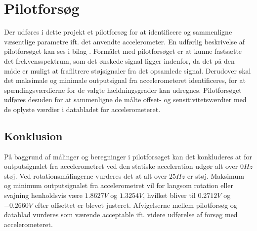 \section{Pilotforsøg}\label{Sec:PilotforsoegKort}
Der udføres i dette projekt et pilotforsøg for at identificere og sammenligne væsentlige parametre ift. det anvendte accelerometer. En udførlig beskrivelse af pilotforsøget kan ses i bilag .
Formålet med pilotforsøget er at kunne fastsætte det frekvensspektrum, som det ønskede signal ligger indenfor, da det på den måde er muligt at frafiltrere støjsignaler fra det opsamlede signal. Derudover skal det maksimale og minimale outputsignal fra accelerometeret identificeres, for at spændingsværdierne for de valgte hældningsgrader kan udregnes. Pilotforsøget udføres desuden for at sammenligne de målte offset- og sensitivitetsværdier med de oplyste værdier i databladet for accelerometeret. 
\subsection{Konklusion}
På baggrund af målinger og beregninger i pilotforsøget kan det konkluderes at for outputsignalet fra accelerometret ved den statiske acceleration udgør alt over $0Hz$ støj. Ved rotationsmålingerne vurderes det at alt over $25Hz$ er støj. Maksimum og minimum outputsignalet fra accelerometret vil for langsom rotation eller svajning henholdsvis være $1.8627V$ og $1.3254V$, hvilket bliver til $0.2712V$ og $-0.2660V$ efter offsettet er blevet justeret. Afvigelserne mellem pilotforsøg og datablad vurderes som værende acceptable ift. videre udførelse af forsøg med accelerometeret. 

